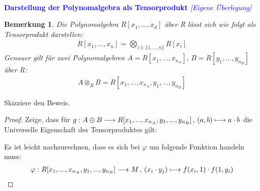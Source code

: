 \documentclass[10pt,a4paper]{report}
\newcounter{Aussage}[chapter]
\newtheorem{bem}[Aussage]{Bemerkung}
\newcommand{\function}[5]{\nolinebreak{#1:#2 \longrightarrow #3 \, , \, #4 \longmapsto #5}}
\newcommand{\Tensor}[3]{#1 \otimes_{#2} #3}
\begin{document}
\ \\
\textcolor{blue}{\textbf{Darstellung der Polynomalgebra als Tensorprodukt} \textit{[Eigene Überlegung]}}
\begin{bem}\label{Darstellung der Polynomalgebra als Tensorprodukt}
Die Polynomalgebra $R[x_1,...,x_d]$ über R lässt sich wie folgt als Tensorprodukt darstellen:
\begin{gather*}
R[x_1,...,x_n] = \bigotimes_{i \in \lbrace 1,...,n \rbrace} R[x_i]
\end{gather*}
Genauer gilt für zwei Polynomalgebren $A = R[x_1,...,x_{n_A}], \, B = R[y_1,...,y_{n_B}]$ über R:
\begin{gather*}
\Tensor{A}{R}{B}  = R[x_1,...,x_{n_A},y_1,...,y_{n_B}]
\end{gather*}
\end{bem}
Skizziere den Beweis.
\begin{proof}
Zeige, dass für $\function{g}{A \oplus B}{R[x_1,...,x_{n_A},y_1,...,y_{n_B}]}{(a,b)}{a \cdot b}$ die Universelle Eigenschaft des Tensorproduktes gilt:
\begin{center}
\end{center}
Es ist leicht nachzurechnen, dass es sich bei $\varphi$ um folgende Funktion handeln muss:
\begin{gather*}
\function{\varphi}{R[x_1,...,x_{n_A},y_1,...,y_{n_B}]}{M}{(x_i \cdot y_j)}{f(x_i,1) \cdot f(1,y_i)}
\end{gather*}
\end{proof}
\end{document}

